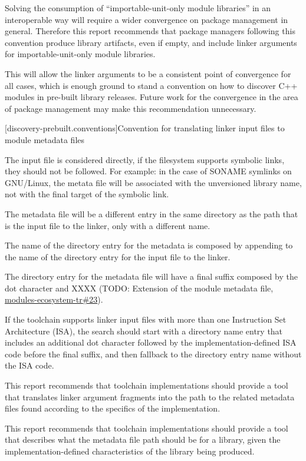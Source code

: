 \pnum Solving the consumption of “importable-unit-only module
libraries” in an interoperable way will require a wider convergence on
package management in general. Therefore this report recommends that
package managers following this convention produce library artifacts,
even if empty, and include linker arguments for importable-unit-only
module libraries.

\pnum This will allow the linker arguments to be a consistent point of
convergence for all cases, which is enough ground to stand a
convention on how to discover C++ modules in pre-built library
releases. Future work for the convergence in the area of package
management may make this recommendation unnecessary.

[discovery-prebuilt.conventions]{Convention for translating
  linker input files to module metadata files}

\pnum The input file is considered directly, if the filesystem
supports symbolic links, they should not be followed. For example: in
the case of SONAME symlinks on GNU/Linux, the metata file will be
associated with the unversioned library name, not with the final
target of the symbolic link.

\pnum The metadata file will be a different entry in the same
directory as the path that is the input file to the linker, only with
a different name.

\pnum The name of the directory entry for the metadata is composed by
appending to the name of the directory entry for the input file to the
linker.

\pnum The directory entry for the metadata file will have a final suffix
composed by the dot character and XXXX (TODO: Extension of the module
metadata file,
\href{https://github.com/cplusplus/modules-ecosystem-tr/issues/23}{modules-ecosystem-tr\#23}).

\pnum If the toolchain supports linker input files with more than one
Instruction Set Architecture (ISA), the search should start with a
directory name entry that includes an additional dot character
followed by the implementation-defined ISA code before the final
suffix, and then fallback to the directory entry name without the ISA
code.

\pnum This report recommends that toolchain implementations should
provide a tool that translates linker argument fragments into the path
to the related metadata files found according to the specifics of the
implementation.

\pnum This report recommends that toolchain implementations should
provide a tool that describes what the metadata file path should be
for a library, given the implementation-defined characteristics of the
library being produced.
